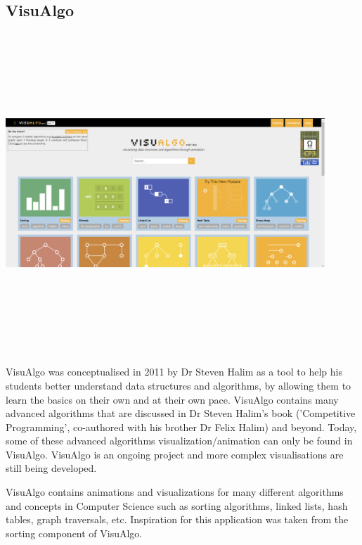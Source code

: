 \subsection{VisuAlgo}
\begin{center}
    \includegraphics[width=12cm,height=12cm,keepaspectratio]{images/visualgonet}
\end{center}
VisuAlgo was conceptualised in 2011 by Dr Steven Halim as a tool to help his students better understand data structures and algorithms, by allowing them to learn the basics on their own and at their own pace. VisuAlgo contains many advanced algorithms that are discussed in Dr Steven Halim's book ('Competitive Programming', co-authored with his brother Dr Felix Halim) and beyond. Today, some of these advanced algorithms visualization/animation can only be found in VisuAlgo. VisuAlgo is an ongoing project and more complex visualisations are still being developed.
\par
\bigskip
VisuAlgo contains animations and visualizations for many different algorithms and concepts in Computer Science such as sorting algorithms, linked lists, hash tables, graph traversals, etc. Inspiration for this application was taken from the sorting component of VisuAlgo.
